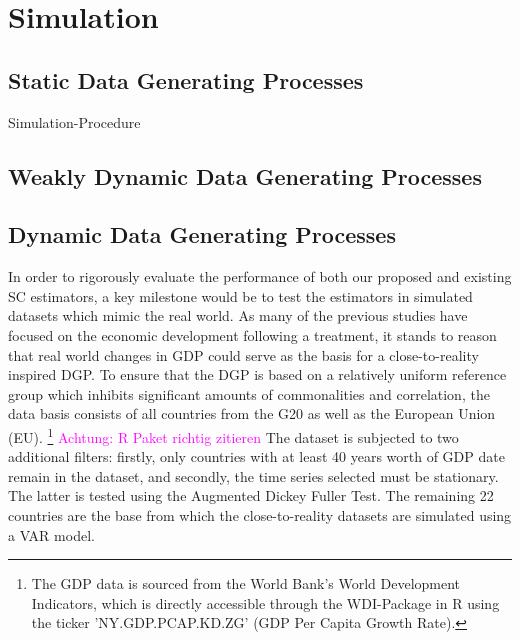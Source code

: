 \section{Simulation}

\subsection{Static Data Generating Processes}

Simulation-Procedure


\subsection{Weakly Dynamic Data Generating Processes}
\subsection{Dynamic Data Generating Processes}
In order to rigorously evaluate the performance of both our proposed and existing SC estimators, a key milestone would be to test the estimators in simulated datasets which mimic the real world. As many of the previous studies have focused on the economic development following a treatment, it stands to reason that real world changes in GDP could serve as the basis for a close-to-reality inspired DGP.
To ensure that the DGP is based on a relatively uniform reference group which inhibits significant amounts of commonalities and correlation, the data basis consists of all countries from the G20 as well as the European Union (EU). \footnote{The GDP data is sourced from the World Bank's World Development Indicators, which is directly accessible through the WDI-Package in R using the ticker 'NY.GDP.PCAP.KD.ZG' (GDP Per Capita Growth Rate).} 
\textcolor{magenta}{Achtung: R Paket richtig zitieren}
The dataset is subjected to two additional filters: firstly, only countries with at least 40 years worth of GDP date remain in the dataset, and secondly, the time series selected must be stationary. The latter is tested using the Augmented Dickey Fuller Test. The remaining 22 countries are the base from which the close-to-reality datasets are simulated using a VAR model.
